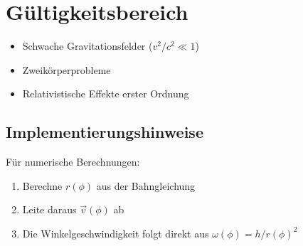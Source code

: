 \section{Gültigkeitsbereich}
\begin{itemize}
\item Schwache Gravitationsfelder ($v^2/c^2 \ll 1$)
\item Zweikörperprobleme
\item Relativistische Effekte erster Ordnung
\end{itemize}

\subsection{Implementierungshinweise}
Für numerische Berechnungen:
\begin{enumerate}
\item Berechne $r(\phi)$ aus der Bahngleichung
\item Leite daraus $\vec{v}(\phi)$ ab
\item Die Winkelgeschwindigkeit folgt direkt aus $\omega(\phi) = h/r(\phi)^2$
\end{enumerate}